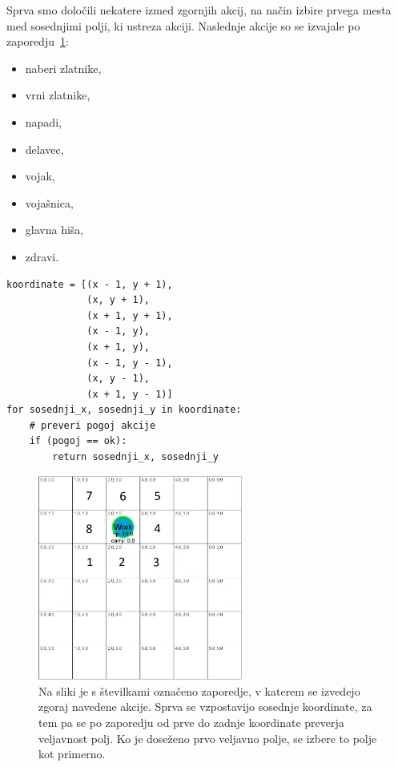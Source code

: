 \documentclass[a4paper, 12pt]{book}
\begin{document}
Sprva smo določili nekatere izmed zgornjih akcij, na način izbire prvega mesta med sosednjimi polji, ki ustreza akciji. 
Naslednje akcije so se izvajale po zaporedju~\ref{pickorakiPreverjanja}:
\begin{itemize}
	\item naberi zlatnike,
	\item vrni zlatnike,
	\item napadi,
	\item delavec,
	\item vojak, 
	\item vojašnica,
	\item glavna hiša,
	\item zdravi.
\end{itemize}
\begin{verbatim}
koordinate = [(x - 1, y + 1),
              (x, y + 1),
              (x + 1, y + 1),
              (x - 1, y),
              (x + 1, y),
              (x - 1, y - 1),
              (x, y - 1),
              (x + 1, y - 1)]
for sosednji_x, sosednji_y in koordinate:
    # preveri pogoj akcije
    if (pogoj == ok):
        return sosednji_x, sosednji_y
\end{verbatim}

\begin{figure}[h]
	\begin{center}
		\includegraphics[width=0.6\textwidth]{photos/korakiPreverjanja.pdf}
	\end{center}
	\caption{Na sliki je s številkami označeno zaporedje, v katerem se izvedejo zgoraj navedene akcije. Sprva se vzpostavijo sosednje koordinate, za tem pa se po zaporedju od prve do zadnje koordinate preverja veljavnost polj. Ko je doseženo prvo veljavno polje, se izbere to polje kot primerno. }
	\label{pickorakiPreverjanja}
\end{figure}
\end{document}
